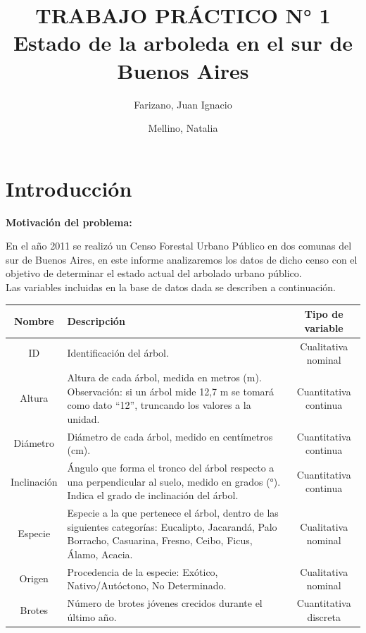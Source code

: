 \documentclass[11pt]{article}
\begin{document}
\title{
  TRABAJO PRÁCTICO N° 1\\
  \large Estado de la arboleda en el sur de Buenos Aires
}
\author{
  Farizano, Juan Ignacio\\
  \and
  Mellino, Natalia
}
\date{}
\maketitle
\newpage

\tableofcontents
\newpage

\section{Introducción}
\textbf{Motivación del problema:}

\begin{justify}
  En el año 2011 se realizó un Censo Forestal Urbano Público en dos
  comunas del sur de Buenos Aires, en este informe analizaremos los datos de
  dicho censo con el objetivo de determinar el estado actual del arbolado urbano 
  público.\\
  Las variables incluidas en la base de datos dada se describen a continuación.
\end{justify}
\begin{center}
  \begin{tabular}{| c | p{9cm} | c |}
    \hline
    \textbf{Nombre} & \textbf{Descripción} & \textbf{Tipo de variable} \\ \hline
    ID & Identificación del árbol. & Cualitativa nominal \\ \hline
    Altura & Altura de cada árbol, medida en metros (m). Observación: si un árbol
    mide 12,7 m se tomará como dato “12”, truncando los valores a la unidad. & 
    Cuantitativa continua \\ \hline
    Diámetro & Diámetro de cada árbol, medido en centímetros (cm). & 
    Cuantitativa continua \\ \hline
    Inclinación & Ángulo que forma el tronco del árbol respecto a una perpendicular al suelo,
    medido en grados (°). Indica el grado de inclinación del árbol. &
    Cuantitativa continua \\ \hline
    Especie & Especie a la que pertenece el árbol, dentro de las siguientes
    categorías: Eucalipto, Jacarandá, Palo Borracho, Casuarina, Fresno, Ceibo,
    Ficus, Álamo, Acacia. & Cualitativa nominal \\ \hline
    Origen & Procedencia de la especie: Exótico, Nativo/Autóctono, 
    No Determinado. & Cualitativa nominal \\ \hline
    Brotes & Número de brotes jóvenes crecidos durante el último año. &
    Cuantitativa discreta \\ \hline
  \end{tabular}
\end{center}
\end{document}
